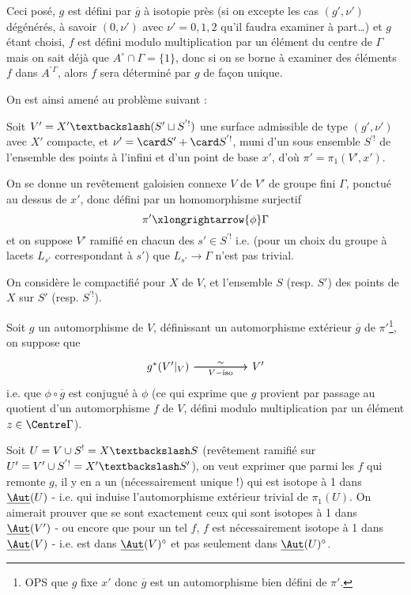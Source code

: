 Ceci posé, $g$ est défini par $\overline{g}$ à isotopie près (si on excepte les cas $(g', \nu')$ dégénérés, à savoir $(0, \nu')$ avec $\nu' = 0, 1, 2$ qu'il faudra examiner à part\dots) et $g$ étant choisi, $f$ est défini modulo multiplication par un élément du centre de $\Gamma$ mais on sait déjà que $A^\circ \cap \Gamma = \{ 1 \}$, donc si on se borne à examiner des éléments $f$ dans $A^{^\circ \Gamma}$, alors $f$ sera déterminé par $g$ de fa\c{c}on unique.
 
On est ainsi amené au problème suivant :

Soit $V' = X' \textbackslash (S' \sqcup S^{'!})$ une surface admissible de type $(g', \nu')$ avec $X'$ compacte, et $\nu' = \card S' + \card S^{'!}$, muni d'un sous ensemble $S^{'!}$ de l'ensemble des points à l'infini et d'un point de base $x'$, d'où $\pi' = \pi_1 (V', x')$.

On se donne un revêtement galoisien connexe $V$ de $V'$ de groupe fini $\Gamma$, ponctué au dessus de $x'$, donc défini par un homomorphisme surjectif
$$
\pi' \xlongrightarrow{\phi} \Gamma
$$
et on suppose $V'$ ramifié en chacun des $s' \in S^{'!}$ i.e. (pour un choix du groupe à lacets $L_{s'}$ correspondant à $s'$) que $L_{s'} \to \Gamma$ n'est pas trivial. 

On considère le compactifié pour $X$ de $V$, et l'ensemble $S$ (resp. $S'$) des points de $X$ sur $S'$ (resp. $S^{'!}$).

Soit $g$ un automorphisme de $V$, définissant un automorphisme extérieur $\overline{g}$ de $\pi'$\footnote{OPS que $g$ fixe $x'$ donc $\overline{g}$ est un automorphisme bien défini de $\pi'$.}, on suppose que 
\[\begin{tikzcd}
	{g^*(V'|_{V})} && {V'}
	\arrow["\sim", from=1-1, to=1-3]
	\arrow["{V-\text{iso}}"', from=1-1, to=1-3]
\end{tikzcd}\]
i.e. que $\phi \circ \overline{g}$ est conjugué à $\phi$ (ce qui exprime que $g$ provient par passage au quotient d'un automorphisme $f$ de $V$, défini modulo multiplication par un élément $z \in \Centre \Gamma$).

Soit $U = V \cup S^! = X \textbackslash S$ (revêtement ramifié sur $U' = V' \cup S^{'!} = X' \textbackslash S'$), on veut exprimer que parmi les $f$ qui remonte $g$, il y en a un (nécessairement unique !) qui est isotope à 1 dans $\underline{\Aut}(U)$ - i.e. qui induise l'automorphisme extérieur trivial de $\pi_1(U)$. On aimerait prouver que se sont exactement ceux qui sont isotopes à 1 dans $\underline{\Aut}(V')$ - ou encore que pour un tel $f$, $f$ est nécessairement isotope à 1 dans $\underline{\Aut} (V)$ - i.e. est dans $\underline{\Aut} (V)^\circ$ et pas seulement dans $\underline{\Aut} (U)^\circ$.

